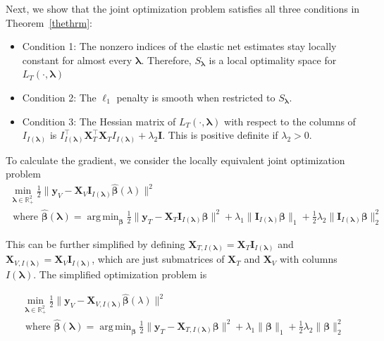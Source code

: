 \documentclass[10pt,letterpaper]{article}
\DeclareMathOperator*{\argmin}{arg\,min}
\begin{document}
Next, we show that the joint optimization problem satisfies all three conditions in Theorem~\ref{thethrm}:
\begin{itemize}
\item[] Condition 1: The nonzero indices of the elastic net estimates stay locally constant for almost every $\boldsymbol{\lambda}$. Therefore, $S_{\boldsymbol{\lambda}}$ is a local optimality space for $L_T(\cdot, \boldsymbol{\lambda})$ \hfill {}
\item[] Condition 2: The $\ell_1$ penalty is smooth when restricted to $S_{\boldsymbol{\lambda}}$.\hfill {}
\item[] Condition 3: The Hessian matrix of $L_T(\cdot, \boldsymbol{\lambda})$ with respect to the columns of $I_{I(\boldsymbol \lambda)}$ is $I_{I(\boldsymbol \lambda)}^\top \boldsymbol{X}_{T}^\top \boldsymbol{X}_{T} I_{I(\boldsymbol \lambda)} + \lambda_2 \boldsymbol{I}$. This is positive definite if $\lambda_2 > 0$. \hfill {}
\end{itemize}

To calculate the gradient, we consider the locally equivalent joint optimization problem
\begin{equation}
\begin{array}{c}
\min_{\boldsymbol{\lambda} \in \mathbb{R}^2_{+}} \frac{1}{2} \| \boldsymbol{y}_V - \boldsymbol{X}_V \boldsymbol{I}_{I(\boldsymbol \lambda)} \hat{\boldsymbol{\beta}} (\lambda) \| ^2 \\
\text{ where }
\hat{\boldsymbol{\beta}} (\boldsymbol{\lambda}) = \argmin_{\boldsymbol{\beta}} \frac{1}{2} \| \boldsymbol{y}_T - \boldsymbol{X}_T \boldsymbol{I}_{I(\boldsymbol \lambda)} \boldsymbol{\beta} \| ^2
+ \lambda_1 \| \boldsymbol{I}_{I(\boldsymbol \lambda)} \boldsymbol{\beta} \|_1
+ \frac{1}{2}\lambda_2 \| \boldsymbol{I}_{I(\boldsymbol \lambda)} \boldsymbol{\beta} \|_2^2
\end{array}
\end{equation}

This can be further simplified by defining $\boldsymbol{X}_{T, I(\boldsymbol\lambda)} = \boldsymbol{X}_T \boldsymbol{I}_{I(\boldsymbol \lambda)}$ and $\boldsymbol{X}_{V, I(\boldsymbol\lambda)}  = \boldsymbol{X}_V \boldsymbol{I}_{I(\boldsymbol \lambda)}$, which are just submatrices of $\boldsymbol{X}_T$ and $\boldsymbol{X}_V$ with columns $I(\boldsymbol \lambda)$. The simplified optimization problem is

\begin{equation}
\begin{array}{c}
\min_{\boldsymbol{\lambda} \in \mathbb{R}^2_{+}} \frac{1}{2} \| \boldsymbol{y}_V - \boldsymbol{X}_{V, I(\boldsymbol \lambda)} \hat{\boldsymbol{\beta}} (\lambda) \| ^2 \\
\text{ where }
\hat{\boldsymbol{\beta}} (\boldsymbol{\lambda}) = \argmin_{\boldsymbol \beta} \frac{1}{2} \| \boldsymbol{y}_T - \boldsymbol{X}_{T, I(\boldsymbol \lambda)} \boldsymbol \beta \| ^2
+ \lambda_1 \| \boldsymbol \beta \|_1
+ \frac{1}{2}\lambda_2 \| \boldsymbol \beta \|_2^2
\end{array}
\end{equation}
\end{document}
